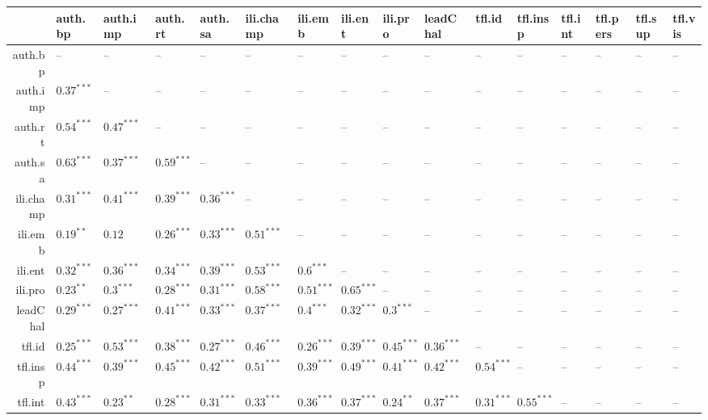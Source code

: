 \begin{table}[ht]
\centering
\begin{tabular}{rlllllllllllllll}
  \hline
 & auth.bp & auth.imp & auth.rt & auth.sa & ili.champ & ili.emb & ili.ent & ili.pro & leadChal & tfl.id & tfl.insp & tfl.int & tfl.pers & tfl.sup & tfl.vis \\ 
  \hline
auth.bp & -- & -- & -- & -- & -- & -- & -- & -- & -- & -- & -- & -- & -- & -- & -- \\ 
  auth.imp & $0.37^{***}$ & -- & -- & -- & -- & -- & -- & -- & -- & -- & -- & -- & -- & -- & -- \\ 
  auth.rt & $0.54^{***}$ & $0.47^{***}$ & -- & -- & -- & -- & -- & -- & -- & -- & -- & -- & -- & -- & -- \\ 
  auth.sa & $0.63^{***}$ & $0.37^{***}$ & $0.59^{***}$ & -- & -- & -- & -- & -- & -- & -- & -- & -- & -- & -- & -- \\ 
  ili.champ & $0.31^{***}$ & $0.41^{***}$ & $0.39^{***}$ & $0.36^{***}$ & -- & -- & -- & -- & -- & -- & -- & -- & -- & -- & -- \\ 
  ili.emb & $0.19^{**}$ & $0.12$ & $0.26^{***}$ & $0.33^{***}$ & $0.51^{***}$ & -- & -- & -- & -- & -- & -- & -- & -- & -- & -- \\ 
  ili.ent & $0.32^{***}$ & $0.36^{***}$ & $0.34^{***}$ & $0.39^{***}$ & $0.53^{***}$ & $0.6^{***}$ & -- & -- & -- & -- & -- & -- & -- & -- & -- \\ 
  ili.pro & $0.23^{**}$ & $0.3^{***}$ & $0.28^{***}$ & $0.31^{***}$ & $0.58^{***}$ & $0.51^{***}$ & $0.65^{***}$ & -- & -- & -- & -- & -- & -- & -- & -- \\ 
  leadChal & $0.29^{***}$ & $0.27^{***}$ & $0.41^{***}$ & $0.33^{***}$ & $0.37^{***}$ & $0.4^{***}$ & $0.32^{***}$ & $0.3^{***}$ & -- & -- & -- & -- & -- & -- & -- \\ 
  tfl.id & $0.25^{***}$ & $0.53^{***}$ & $0.38^{***}$ & $0.27^{***}$ & $0.46^{***}$ & $0.26^{***}$ & $0.39^{***}$ & $0.45^{***}$ & $0.36^{***}$ & -- & -- & -- & -- & -- & -- \\ 
  tfl.insp & $0.44^{***}$ & $0.39^{***}$ & $0.45^{***}$ & $0.42^{***}$ & $0.51^{***}$ & $0.39^{***}$ & $0.49^{***}$ & $0.41^{***}$ & $0.42^{***}$ & $0.54^{***}$ & -- & -- & -- & -- & -- \\ 
  tfl.int & $0.43^{***}$ & $0.23^{**}$ & $0.28^{***}$ & $0.31^{***}$ & $0.33^{***}$ & $0.36^{***}$ & $0.37^{***}$ & $0.24^{**}$ & $0.37^{***}$ & $0.31^{***}$ & $0.55^{***}$ & -- & -- & -- & -- \\ 

\end{tabular}
\end{table}
